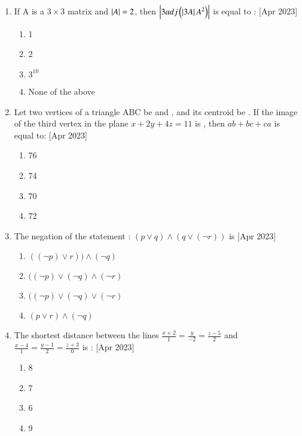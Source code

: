 \documentclass[journal]{IEEEtran}
\begin{document}
\begin{enumerate}
    \item If A is a $3\times 3$ matrix and $\left\vert A\right\vert=2$, then $\left\vert3adj\left(\left\vert3A\right\vert A^{2}\right)\right\vert$ is equal to :
     \hfill{[Apr 2023]}
		\begin{multicols}{1}
			\begin{enumerate}
				\item 1
    \item 2
    \item $3^{10}$
    \item None of the above
			\end{enumerate}
		\end{multicols}

    \item Let two vertices of a triangle ABC be  and , and its centroid be . If the image of the third vertex in the plane $x+2y+4z=11$ is , then $ab+bc+ca$ is equal to:
     \hfill{[Apr 2023]}
		\begin{multicols}{1}
			\begin{enumerate}
				
				\item 76
    \item 74
     \item 70
      \item 72
			\end{enumerate}
		\end{multicols}

    \item The negation of the statement : $(p \lor q) \land (q \lor (\neg r))$ is
     \hfill{[Apr 2023]}
    \begin{multicols}{1}
            \begin{enumerate}
              \item $((\neg p) \lor r)) \land (\neg q)$
              \item  $((\neg p) \lor (\neg q) \land(\neg r)$
              \item  $((\neg p) \lor (\neg q) \lor(\neg r)$
              \item $(p \lor r) \land  (\neg q)$
            \end{enumerate}
        \end{multicols}
    \item The shortest distance between the lines $\frac{x+2}{1}=\frac{y}{-2}=\frac{z-5}{2} $ and $\frac{x-4}{1}=\frac{y-1}{2}=\frac{z+3}{0}$ is :
     \hfill{[Apr 2023]}
    \begin{multicols}{1}
            \begin{enumerate}
              \item 8
              \item  7
              \item  6
              \item 9
            \end{enumerate}
        \end{multicols}


\end{enumerate}
\end{document}
